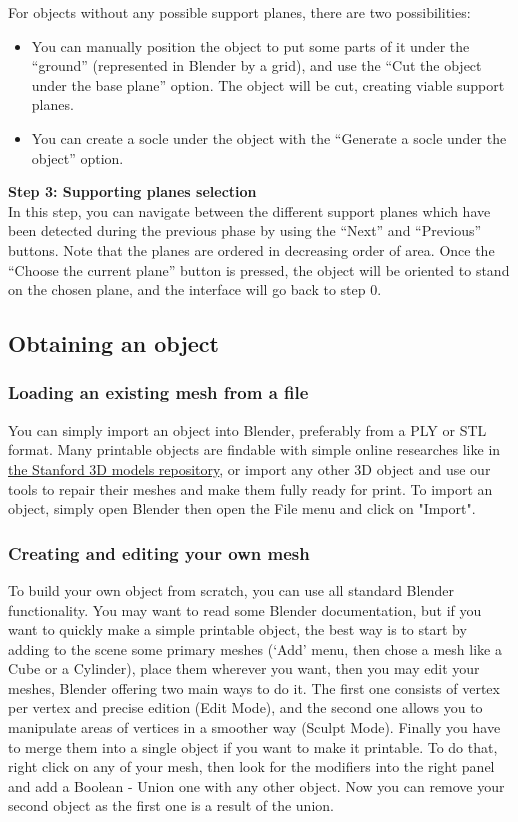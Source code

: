 \documentclass{article}
\begin{document}
For objects without any possible support planes, there are two possibilities:
\begin{itemize}
\item You can manually position the object to put some parts of it under the ``ground'' (represented in Blender by a grid), and use the ``Cut the object under the base plane'' option. The object will be cut, creating viable support planes.
\item You can create a socle under the object with the ``Generate a socle under the object'' option.
\end{itemize}

\textbf{Step 3: Supporting planes selection}\\ 

In this step, you can navigate between the different support planes which have been detected during the previous phase by using the ``Next'' and ``Previous'' buttons. Note that the planes are ordered in decreasing order of area. Once the ``Choose the current plane'' button is pressed, the object will be oriented to stand on the chosen plane, and the interface will go back to step 0.

\subsection{Obtaining an object}

\subsubsection{Loading an existing mesh from a file}

You can simply import an object into Blender, preferably from a PLY or STL format. Many printable objects are findable with simple online researches like in \href{http://graphics.stanford.edu/data/3Dscanrep/}{the Stanford 3D models repository}, or import any other 3D object and use our tools to repair their meshes and make them fully ready for print.
To import an object, simply open Blender then open the File menu and click on "Import".

\subsubsection{Creating and editing your own mesh}

To build your own object from scratch, you can use all standard Blender functionality. You may want to read some Blender documentation, but if you want to quickly make a simple printable object, the best way is to start by adding to the scene some primary meshes (`Add' menu, then chose a mesh like a Cube or a Cylinder), place them wherever you want, then you may edit your meshes, Blender offering two main ways to do it. The first one consists of vertex per vertex and precise edition (Edit Mode), and the second one allows you to manipulate areas of vertices in a smoother way (Sculpt Mode). Finally you have to merge them into a single object if you want to make it printable. To do that, right click on any of your mesh, then look for the modifiers into the right panel and add a Boolean - Union one with any other object. Now you can remove your second object as the first one is a result of the union.
\end{document}
